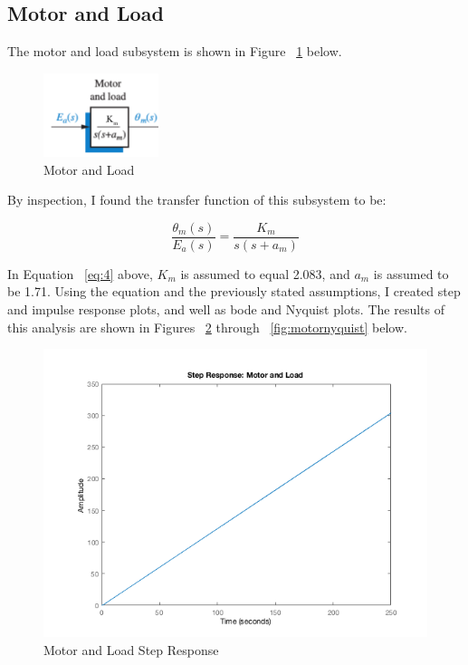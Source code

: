 \documentclass[12pt]{article}
\begin{document}
\subsection{Motor and Load}

The motor and load subsystem is shown in Figure ~\ref{fig:motor} below.

\begin{figure}[H]
\begin{center}
	\includegraphics[width=0.3\textwidth]{./img/MotorBlock.png}
	\caption{\label{fig:motor}Motor and Load}
\end{center}
\end{figure}

By inspection, I found the transfer function of this subsystem to be:

\begin{equation}
\frac{\theta_{m}(s)}{E_{a}(s)} = \frac{K_{m}}{s(s+a_{m})}\label{eq:4}
\end{equation}

In Equation ~\ref{eq:4} above, $K_{m}$ is assumed to equal 2.083, and $a_{m}$ is assumed to be 1.71. Using the equation and the previously stated assumptions, I created step and impulse response plots, and well as bode and Nyquist plots. The results of this analysis are shown in Figures ~\ref{fig:motorstep} through ~\ref{fig:motornyquist} below.

\begin{figure}[H]
\begin{center}
	\includegraphics[width=\textwidth]{./img/MotorStep.png}
	\caption{\label{fig:motorstep}Motor and Load Step Response}
\end{center}
\end{figure}
\end{document}
